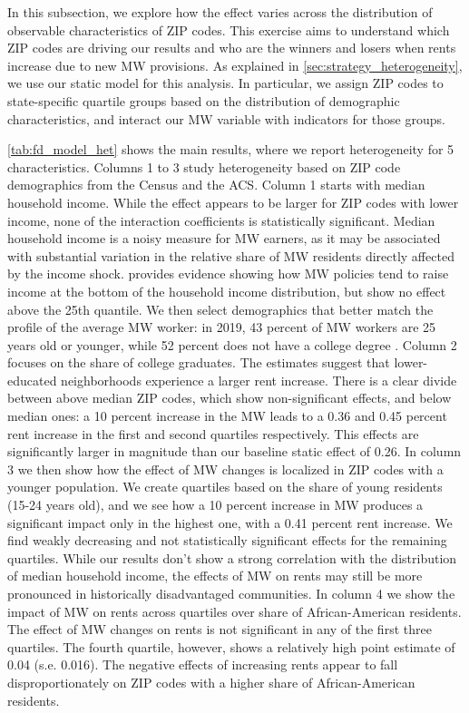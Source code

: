 In this subsection, we explore how the effect varies across the distribution of observable 
characteristics of ZIP codes. This exercise aims to understand which ZIP codes are driving 
our results and who are the winners and losers when rents increase due to new MW provisions. 
As explained in \autoref{sec:strategy_heterogeneity}, we use our static model for this analysis. 
In particular, we assign ZIP codes to state-specific quartile groups based on the distribution of demographic
characteristics, and interact our MW variable with indicators for those groups. 

\autoref{tab:fd_model_het} shows the main results, where we report heterogeneity for 5 
characteristics. Columns 1 to 3 study heterogeneity based on ZIP code demographics from the 
Census and the ACS. Column 1 starts with median household income. While the effect appears to 
be larger for ZIP codes with lower income, none of the interaction coefficients is statistically 
significant. Median household income is a noisy measure for MW earners, as it may be associated 
with substantial variation in the relative share of MW residents directly affected by the income 
shock. \textcite{dube2019minimum} provides evidence showing how MW policies tend to raise income 
at the bottom of the household income distribution, but show no effect above the 25th quantile. 
We then select demographics that better match the profile of the average MW worker: 
in 2019, 43 percent of MW workers are 25 years old 
or younger, while 52 percent does not have a college degree \parencite{MinWorkersReportBLS}. 
Column 2 focuses on the share of college graduates. The estimates suggest that 
lower-educated neighborhoods experience a larger rent increase. There is a clear divide 
between above median ZIP codes, which show non-significant effects, and below median ones:
a 10 percent increase in the  MW leads to a 0.36 and 0.45 percent rent increase in the first and second
quartiles respectively. This effects are significantly larger in magnitude than our baseline static 
effect of 0.26. In column 3 we then show how the effect of MW changes is localized in ZIP codes
with a younger population. We create quartiles based on the share of young residents (15-24 years old), 
and we see how a 10 percent increase in MW produces a significant impact only in the highest one, 
with a 0.41 percent rent increase. We find weakly decreasing and not statistically significant effects
for the remaining quartiles. 
While our results don't show a strong correlation with the distribution of median household income, 
the effects of MW on rents may still be more pronounced in historically disadvantaged communities. 
In column 4 we show the impact of MW on rents across quartiles over share of 
African-American residents. The effect of MW changes on rents is not significant in any of the 
first three quartiles. The fourth quartile, however, shows a relatively high point estimate of 
0.04 (s.e. 0.016). The negative effects of increasing rents appear to fall disproportionately 
on ZIP codes with a higher share of African-American residents. 


